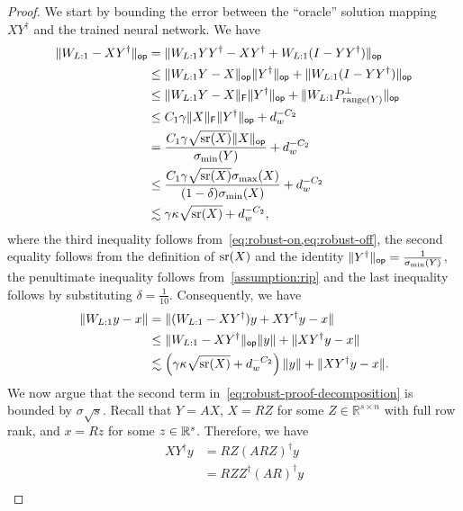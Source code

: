 \begin{proof}
    We start by bounding the error between the ``oracle'' solution mapping $XY^{\dag}$ and the trained neural network. We have
    \begin{align*}
        \lVert W_{L:1}-XY^{\dag}\rVert_{\mathsf{op}} &=  \lVert W_{L:1}YY^{\dag}-XY^{\dag}+  W_{L:1}(I-YY^{\dag})\rVert_{\mathsf{op}}\\
        & \leq \lVert W_{L:1}Y-X\rVert_{\mathsf{op}} \lVert Y^{\dag}\rVert_{\mathsf{op}}+ \lVert W_{L:1}(I-YY^{\dag})\rVert_{\mathsf{op}}\\
        & \leq \lVert W_{L:1}Y-X\rVert_{\mathsf{F}} \lVert Y^{\dag}\rVert_{\mathsf{op}}+ \lVert W_{L:1}P_{\mathrm{range}(Y)}^{\perp}\rVert_{\mathsf{op}} \\
        & \leq
        C_1 \gamma \lVert X\rVert_{\mathsf{F}} \lVert Y^{\dag}\rVert_{\mathsf{op}} + d_{w}^{-C_2} \\
        & = \frac{C_1 \gamma \sqrt{\operatorname{\mathrm{sr}}(X)} \lVert X\rVert_{\mathsf{op}}}{\sigma_{\min}(Y)}
        + d_{w}^{-C_2} \\
        & \leq \frac{C_1 \gamma \sqrt{\operatorname{\mathrm{sr}}(X)} \sigma_{\max}(X)}{(1 - \delta) \sigma_{\min}(X)}
        + d_{w}^{-C_2} \\
        & \lesssim \gamma \kappa \sqrt{\operatorname{\mathrm{sr}}(X)} + d_{w}^{-C_2},
    \end{align*}
    where the third inequality follows from~\cref{eq:robust-on,eq:robust-off},
    the second equality follows from the definition of $\operatorname{\mathrm{sr}}(X)$ and the identity
    $\lVert Y^{\dag}\rVert_{\mathsf{op}} = \frac{1}{\sigma_{\min}(Y)}$, the penultimate inequality
    follows from~\cref{assumption:rip} and the last inequality follows by
    substituting $\delta = \frac{1}{10}$. Consequently, we have
    \begin{align}
        \lVert W_{L:1}y - x\rVert &=
        \lVert(W_{L:1} - XY^{\dag})y + XY^{\dag}y - x\rVert \notag \\
        &\leq
        \lVert W_{L:1} - XY^{\dag}\rVert_{\mathsf{op}} \lVert y\rVert +
        \lVert XY^{\dag}y - x\rVert \notag \\
        &\lesssim
        \left(\gamma \kappa \sqrt{\operatorname{\mathrm{sr}}(X)} + d_{w}^{-C_2}\right) \lVert y\rVert
        + \lVert XY^{\dag} y - x\rVert.
        \label{eq:robust-proof-decomposition}
    \end{align}
    We now argue that the second term in~\eqref{eq:robust-proof-decomposition}
    is bounded by $\sigma \sqrt{s}$.
    Recall that $Y = AX$, $X = RZ$ for some $Z \in \mathbb{R}^{s \times n}$ with full row rank, and $x = Rz$ for some $z \in \mathbb{R}^{s}$.
    Therefore, we have
    \begin{align*}
        XY^{\dag} y &=
        RZ (ARZ)^{\dag} y \\
        &=
        R ZZ^{\dag} (AR)^{\dag} y \\

\end{align*}
\end{proof}
